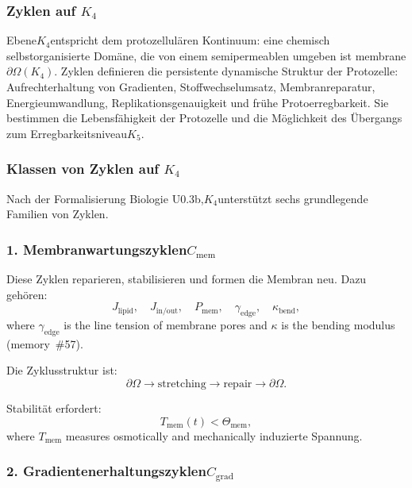 
\subsubsection{Zyklen auf \texorpdfstring{$K_4$}{K_4}}
\label{sec:cycles-k4}

Ebene$K_4$entspricht dem protozellulären Kontinuum:
eine chemisch selbstorganisierte Domäne, die von einem semipermeablen umgeben ist
membrane $\partial\Omega(K_4)$.
Zyklen definieren die persistente dynamische Struktur der Protozelle:
Aufrechterhaltung von Gradienten, Stoffwechselumsatz, Membranreparatur,
Energieumwandlung, Replikationsgenauigkeit und frühe Protoerregbarkeit.
Sie bestimmen die Lebensfähigkeit der Protozelle und die Möglichkeit
des Übergangs zum Erregbarkeitsniveau$K_5$.

\subsubsection{Klassen von Zyklen auf \texorpdfstring{$K_4$}{K_4}}

Nach der Formalisierung Biologie U0.3b,$K_4$unterstützt sechs
grundlegende Familien von Zyklen.

\subsubsection{1. Membranwartungszyklen$C_{\mathrm{mem}}$}

Diese Zyklen reparieren, stabilisieren und formen die Membran neu.
Dazu gehören:
\[
  J_{\mathrm{lipid}},\quad
  J_{\mathrm{in/out}},\quad
  P_{\mathrm{mem}},\quad
  \gamma_{\mathrm{edge}},\quad
  \kappa_{\mathrm{bend}},
\]
where $\gamma_{\mathrm{edge}}$ is the line tension of membrane pores
and $\kappa$ is the bending modulus (memory~\#57).

Die Zyklusstruktur ist:
\[
  \partial\Omega \to 
  \mathrm{stretching} \to 
  \mathrm{repair} \to 
  \partial\Omega.
\]

Stabilität erfordert:
\[
  T_{\mathrm{mem}}(t) < \Theta_{\mathrm{mem}},
\]
where $T_{\mathrm{mem}}$ measures osmotically and mechanically
induzierte Spannung.

\subsubsection{2. Gradientenerhaltungszyklen$C_{\mathrm{grad}}$}

